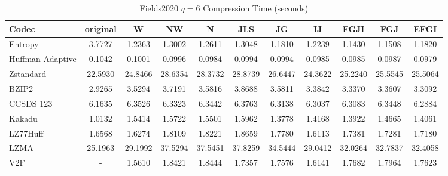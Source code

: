 \documentclass{article}
\begin{document}
\begin{table}[h!]
\centering
\caption{Fields2020 $q=6$ Compression Time (seconds)}
\begin{tabular}{|l|cccccccccc|}
\hline
Codec &  original &       W &      NW &       N &     JLS &      JG &      IJ &    FGJI &     FGJ &    EFGI \\
\hline
Entropy & 3.7727 & 1.2363 & 1.3002 & 1.2611 & 1.3048 & 1.1810 & 1.2239 & 1.1430 & 1.1508 & 1.1820         \\
\hline
Huffman Adaptive &    0.1042 &  0.1001 &  0.0996 &  0.0984 &  0.0994 &  0.0994 &  0.0985 &  0.0985 &  0.0987 &  0.0979 \\
Zstandard        &   22.5930 & 24.8466 & 28.6354 & 28.3732 & 28.8739 & 26.6447 & 24.3622 & 25.2240 & 25.5545 & 25.5064 \\
BZIP2            &    2.9265 &  3.5294 &  3.7191 &  3.5816 &  3.8688 &  3.5811 &  3.3842 &  3.3370 &  3.3607 &  3.3092 \\
CCSDS 123        &    6.1635 &  6.3526 &  6.3323 &  6.3442 &  6.3763 &  6.3138 &  6.3037 &  6.3083 &  6.3448 &  6.2884 \\
Kakadu           &    1.0132 &  1.5414 &  1.5722 &  1.5501 &  1.5962 &  1.3778 &  1.4168 &  1.3922 &  1.4665 &  1.4061 \\
LZ77Huff         &    1.6568 &  1.6274 &  1.8109 &  1.8221 &  1.8659 &  1.7780 &  1.6113 &  1.7381 &  1.7281 &  1.7180 \\
LZMA             &   25.1963 & 29.1992 & 37.5294 & 37.5451 & 37.8259 & 34.5444 & 29.0412 & 32.0264 & 32.7837 & 32.4058 \\
V2F              &    - &  1.5610 &  1.8421 &  1.8444 &  1.7357 &  1.7576 &  1.6141 &  1.7682 &  1.7964 &  1.7623 \\
\hline
\end{tabular}
\end{table}

\newpage
\end{document}
